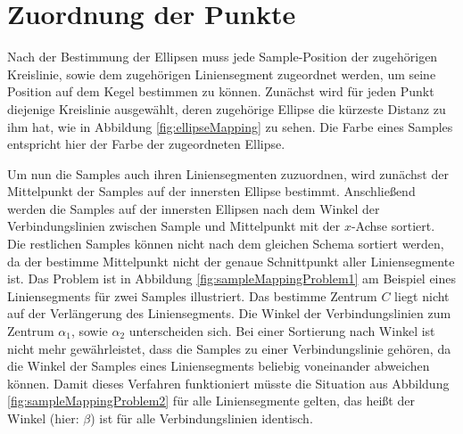 \section{Zuordnung der Punkte}
\label{s:pointMapping}
Nach der Bestimmung der Ellipsen muss jede Sample-Position der zugehörigen Kreislinie, sowie dem zugehörigen Liniensegment zugeordnet werden, um seine Position auf dem Kegel bestimmen zu können.
Zunächst wird für jeden Punkt diejenige Kreislinie ausgewählt, deren zugehörige Ellipse die kürzeste Distanz zu ihm hat, wie in Abbildung \ref{fig:ellipseMapping} zu sehen. Die Farbe eines Samples entspricht hier der Farbe der zugeordneten Ellipse.

Um nun die Samples auch ihren Liniensegmenten zuzuordnen, wird zunächst der Mittelpunkt der Samples auf der innersten Ellipse bestimmt. Anschließend werden die Samples auf der innersten Ellipsen nach dem Winkel der Verbindungslinien zwischen Sample und Mittelpunkt mit der $x$-Achse sortiert.
Die restlichen Samples können nicht nach dem gleichen Schema sortiert werden, da der bestimme Mittelpunkt nicht der genaue Schnittpunkt aller Liniensegmente ist.
Das Problem ist in Abbildung \ref{fig:sampleMappingProblem1} am Beispiel eines Liniensegments für zwei Samples illustriert. Das bestimme Zentrum $C$ liegt nicht auf der Verlängerung des Liniensegments.  Die Winkel der Verbindungslinien zum Zentrum $\alpha_1$, sowie $\alpha_2$ unterscheiden sich. Bei einer Sortierung nach Winkel ist nicht mehr gewährleistet, dass die Samples zu einer Verbindungslinie gehören, da die Winkel der Samples eines Liniensegments beliebig voneinander abweichen können.  Damit dieses Verfahren funktioniert müsste die Situation aus Abbildung \ref{fig:sampleMappingProblem2} für alle Liniensegmente gelten, das heißt der Winkel (hier: $\beta$) ist für alle Verbindungslinien identisch.


